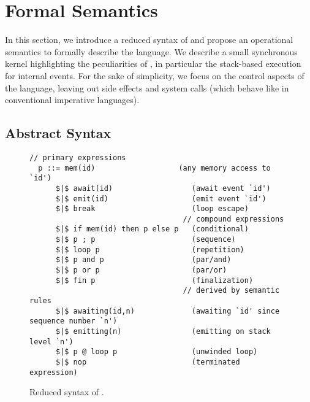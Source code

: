 \newcommand{\ST}{\1\xrightarrow[~n~]{}\1}
\newcommand{\LL}{\langle}
\newcommand{\RR}{\rangle}
\newcommand{\DS}{\displaystyle}

\newcommand{\1}{\;}
\newcommand{\2}{\;\;}
\newcommand{\3}{\;\;\;}
\newcommand{\5}{\;\;\;\;\;}

\section{Formal Semantics}
\label{sec.sem}

%

In this section, we introduce a reduced syntax of \CEU and propose an 
operational semantics to formally describe the language.
We describe a small synchronous kernel highlighting the peculiarities of \CEU, 
in particular the stack-based execution for internal events.
%
For the sake of simplicity, we focus on the control aspects of the language, 
leaving out side effects and system calls (which behave like in conventional 
imperative languages).

\subsection{Abstract Syntax}
\label{sec.sem.syntax}

\begin{figure}
\begin{lstlisting}[mathescape=true]
                                   // primary expressions
  p ::= mem(id)                   (any memory access to `id')
      $|$ await(id)                  (await event `id')
      $|$ emit(id)                   (emit event `id')
      $|$ break                      (loop escape)
                                   // compound expressions
      $|$ if mem(id) then p else p   (conditional)
      $|$ p ; p                      (sequence)
      $|$ loop p                     (repetition)
      $|$ p and p                    (par/and)
      $|$ p or p                     (par/or)
      $|$ fin p                      (finalization)
                                   // derived by semantic rules
      $|$ awaiting(id,n)             (awaiting `id' since sequence number `n')
      $|$ emitting(n)                (emitting on stack level `n')
      $|$ p @ loop p                 (unwinded loop)
      $|$ nop                        (terminated expression)
\end{lstlisting}
\caption{
    Reduced syntax of \CEU.
\label{lst.formal.syntax}
}
\end{figure}

